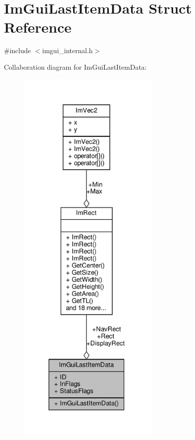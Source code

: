 \hypertarget{structImGuiLastItemData}{}\section{Im\+Gui\+Last\+Item\+Data Struct Reference}
\label{structImGuiLastItemData}


{\ttfamily \#include $<$imgui\+\_\+internal.\+h$>$}



Collaboration diagram for Im\+Gui\+Last\+Item\+Data\+:
\nopagebreak
\begin{figure}[H]
\begin{center}
\leavevmode
\includegraphics[height=550pt]{structImGuiLastItemData__coll__graph}
\end{center}
\end{figure}
